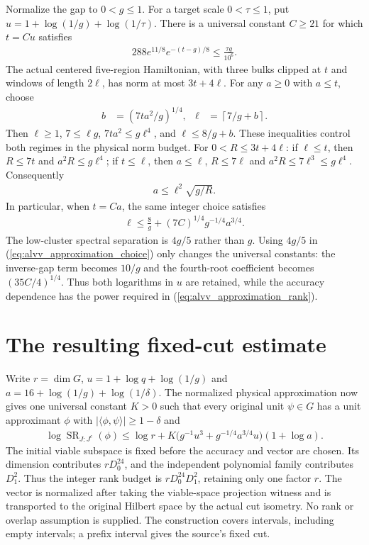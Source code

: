 \documentclass{article}
\begin{document}
Normalize the gap to $0<g\le1$. For a target scale $0<\tau\le1$, put
$u=1+\log(1/g)+\log(1/\tau)$. There is a universal constant $C\ge21$
for which $t=Cu$ satisfies
\begin{align}
    288e^{11/8}e^{-(t-g)/8}\le\frac{\tau g}{10^6}.
    \label{eq:alvv_approximation_tail}
\end{align}
The actual centered five-region Hamiltonian, with three bulks clipped at
$t$ and windows of length $2\ell$, has norm at most $3t+4\ell$.
For any $a\ge0$ with $a\le t$, choose
\begin{align}
    b    & =(7ta^2/g)^{1/4},              &
    \ell & =\left\lceil7/g+b\right\rceil.
    \label{eq:alvv_approximation_choice}
\end{align}
Then $\ell\ge1$, $7\le\ell g$, $7ta^2\le g\ell^4$, and
$\ell\le8/g+b$. These inequalities control both regimes in the
physical norm budget. For $0<R\le3t+4\ell$:
if $\ell\le t$, then $R\le7t$ and $a^2R\le g\ell^4$;
if $t\le\ell$, then $a\le\ell$, $R\le7\ell$ and
$a^2R\le7\ell^3\le g\ell^4$.
Consequently
\begin{align}
    a\le\ell^2\sqrt{g/R}.
    \label{eq:alvv_approximation_corrected_exponent}
\end{align}
In particular, when $t=Ca$, the same integer choice satisfies
\begin{align}
    \ell\le\frac8g+(7C)^{1/4}g^{-1/4}a^{3/4}.
    \label{eq:alvv_approximation_quarter_power}
\end{align}
The low-cluster spectral separation is $4g/5$ rather than $g$.
Using $4g/5$ in (\ref{eq:alvv_approximation_choice}) only changes the
universal constants: the inverse-gap term becomes $10/g$ and the
fourth-root coefficient becomes $(35C/4)^{1/4}$.
Thus both logarithms in $u$ are retained, while the accuracy dependence
has the power required in (\ref{eq:alvv_approximation_rank}).

\section{The resulting fixed-cut estimate}

Write $r=\dim G$, $u=1+\log q+\log(1/g)$ and
$a=16+\log(1/g)+\log(1/\delta)$.
The normalized physical approximation now gives one universal constant $K>0$
such that every original unit $\psi\in G$ has a unit approximant $\phi$ with
$|\langle\phi,\psi\rangle|\ge1-\delta$ and
\begin{align}
    \log\operatorname{SR}_{J:J^c}(\phi)
    \le\log r+K\bigl(g^{-1}u^3+g^{-1/4}a^{3/4}u\bigr)(1+\log a).
    \label{eq:alvv_approximation_explicit_rank}
\end{align}
The initial viable subspace is fixed before the accuracy and vector are
chosen. Its dimension contributes $rD_0^{24}$, and the independent
polynomial family contributes $D_1^2$. Thus the integer rank budget is
$rD_0^{24}D_1^2$, retaining only one factor $r$.
The vector is normalized after taking the viable-space projection witness
and is transported to the original Hilbert space by the actual cut isometry.
No rank or overlap assumption is supplied.
The construction covers intervals, including empty intervals; a prefix
interval gives the source's fixed cut.
\end{document}

